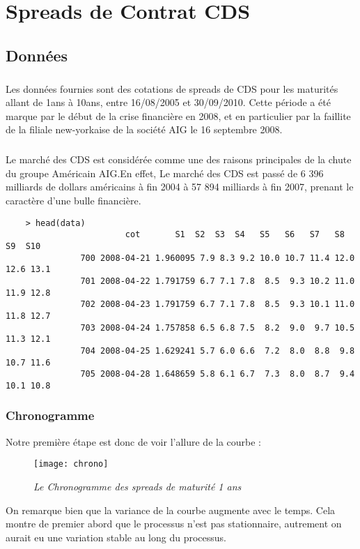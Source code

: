 \section{Spreads de Contrat CDS} 
\subsection{Données}
    \subparagraph{} Les données fournies sont des cotations de spreads de CDS pour les maturités
    allant de 1ans à 10ans, entre 16/08/2005 et
    30/09/2010. 
    Cette période a été marque par le début de la crise financière en 2008, et en
    particulier par la faillite de la filiale new-yorkaise de la société AIG le 16
    septembre 2008. 
    \subparagraph{}
    Le marché des CDS est considérée comme une des raisons principales de la chute
    du groupe Américain AIG.En effet, Le marché des CDS est passé de 6 396 milliards de dollars
    américains à fin 2004 à 57 894 milliards à fin 2007, prenant le caractère d'une
    bulle financière.

    
    \begin{verbatim}
    > head(data)
                        cot       S1  S2  S3  S4   S5   S6   S7   S8   S9  S10
               700 2008-04-21 1.960095 7.9 8.3 9.2 10.0 10.7 11.4 12.0 12.6 13.1
               701 2008-04-22 1.791759 6.7 7.1 7.8  8.5  9.3 10.2 11.0 11.9 12.8
               702 2008-04-23 1.791759 6.7 7.1 7.8  8.5  9.3 10.1 11.0 11.8 12.7
               703 2008-04-24 1.757858 6.5 6.8 7.5  8.2  9.0  9.7 10.5 11.3 12.1
               704 2008-04-25 1.629241 5.7 6.0 6.6  7.2  8.0  8.8  9.8 10.7 11.6
               705 2008-04-28 1.648659 5.8 6.1 6.7  7.3  8.0  8.7  9.4 10.1 10.8
    \end{verbatim}

    \subsubsection{Chronogramme} 
    Notre première étape est donc de voir l'allure de la courbe :
    \begin{figure}[H]
        \centering
        \label{fig:chrono} 
        \texttt{[image: chrono]} 
        \caption{\it Le Chronogramme des spreads de maturité 1 ans } 
    \end{figure}

    On remarque bien que la variance de la courbe augmente avec le temps. Cela
    montre de premier abord que le processus n'est pas stationnaire, autrement
    on aurait eu une variation stable au long du processus.

